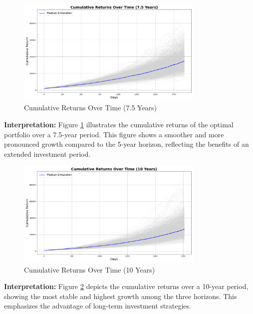 \begin{figure}[!htbp]
    \centering
    \includegraphics[width=0.8\textwidth]{../Figures/cumulative_returns_over_time_7_5_years.png}
    \caption{Cumulative Returns Over Time (7.5 Years)}
    \label{fig:cumulative_returns_7_5y}
\end{figure}

\textbf{Interpretation:} Figure \ref{fig:cumulative_returns_7_5y} illustrates the cumulative returns of the optimal portfolio over a 7.5-year period. This figure shows a smoother and more pronounced growth compared to the 5-year horizon, reflecting the benefits of an extended investment period.

\begin{figure}[!htbp]
    \centering
    \includegraphics[width=0.8\textwidth]{../Figures/cumulative_returns_over_time_10_years.png}
    \caption{Cumulative Returns Over Time (10 Years)}
    \label{fig:cumulative_returns_10y}
\end{figure}

\textbf{Interpretation:} Figure \ref{fig:cumulative_returns_10y} depicts the cumulative returns over a 10-year period, showing the most stable and highest growth among the three horizons. This emphasizes the advantage of long-term investment strategies.







